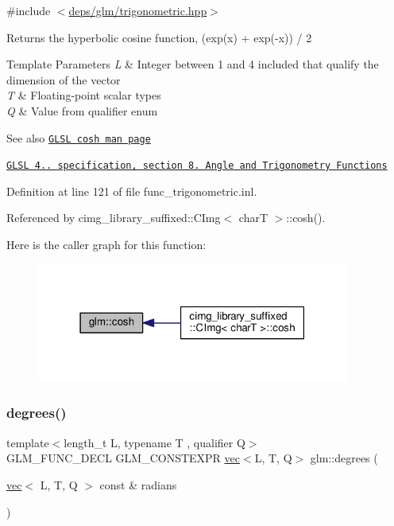 {\ttfamily \#include $<$\hyperlink{trigonometric_8hpp}{deps/glm/trigonometric.\+hpp}$>$}

Returns the hyperbolic cosine function, (exp(x) + exp(-\/x)) / 2


\begin{DoxyTemplParams}{Template Parameters}
{\em L} & Integer between 1 and 4 included that qualify the dimension of the vector \\
\hline
{\em T} & Floating-\/point scalar types \\
\hline
{\em Q} & Value from qualifier enum\\
\hline
\end{DoxyTemplParams}
\begin{DoxySeeAlso}{See also}
\href{http://www.opengl.org/sdk/docs/manglsl/xhtml/cosh.xml}{\tt G\+L\+SL cosh man page} 

\href{http://www.opengl.org/registry/doc/GLSLangSpec.4.20.8.pdf}{\tt G\+L\+SL 4.. specification, section 8. Angle and Trigonometry Functions} 
\end{DoxySeeAlso}


Definition at line 121 of file func\+\_\+trigonometric.\+inl.



Referenced by cimg\+\_\+library\+\_\+suffixed\+::\+C\+Img$<$ char\+T $>$\+::cosh().

Here is the caller graph for this function\+:
\nopagebreak
\begin{figure}[H]
\begin{center}
\leavevmode
\includegraphics[width=291pt]{dc/d43/group__core__func__trigonometric_ga4e260e372742c5f517aca196cf1e62b3_icgraph}
\end{center}
\end{figure}
\mbox{\label{group__core__func__trigonometric_ga8faec9e303538065911ba8b3caf7326b}} 
\subsubsection{\texorpdfstring{degrees()}{degrees()}}
{\footnotesize\ttfamily template$<$length\+\_\+t L, typename T , qualifier Q$>$ \\
G\+L\+M\+\_\+\+F\+U\+N\+C\+\_\+\+D\+E\+CL G\+L\+M\+\_\+\+C\+O\+N\+S\+T\+E\+X\+PR \hyperlink{structglm_1_1vec}{vec}$<$L, T, Q$>$ glm\+::degrees (\begin{DoxyParamCaption}\item[{\hyperlink{structglm_1_1vec}{vec}$<$ L, T, Q $>$ const \&}]{radians }\end{DoxyParamCaption})}



